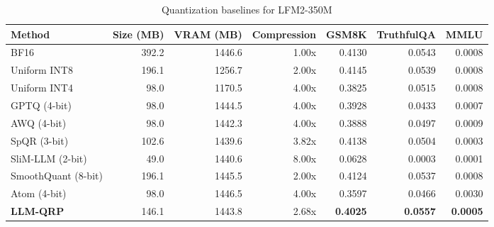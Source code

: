 \begin{table}[htbp]
  \centering
  \small
  \caption{Quantization baselines for LFM2-350M}
  \label{tab:bench_LFM2_350M}
  \begin{tabular}{lrrrrrr}
    \toprule
    \textbf{Method} & \textbf{Size (MB)} & \textbf{VRAM (MB)} & \textbf{Compression} & \textbf{GSM8K} & \textbf{TruthfulQA} & \textbf{MMLU} \\
    \midrule
    BF16 & 392.2 & 1446.6 & 1.00x & 0.4130 & 0.0543 & 0.0008 \\
    Uniform INT8 & 196.1 & 1256.7 & 2.00x & 0.4145 & 0.0539 & 0.0008 \\
    Uniform INT4 & 98.0 & 1170.5 & 4.00x & 0.3825 & 0.0515 & 0.0008 \\
    GPTQ (4-bit) & 98.0 & 1444.5 & 4.00x & 0.3928 & 0.0433 & 0.0007 \\
    AWQ (4-bit) & 98.0 & 1442.3 & 4.00x & 0.3888 & 0.0497 & 0.0009 \\
    SpQR (3-bit) & 102.6 & 1439.6 & 3.82x & 0.4138 & 0.0504 & 0.0003 \\
    SliM-LLM (2-bit) & 49.0 & 1440.6 & 8.00x & 0.0628 & 0.0003 & 0.0001 \\
    SmoothQuant (8-bit) & 196.1 & 1445.5 & 2.00x & 0.4124 & 0.0537 & 0.0008 \\
    Atom (4-bit) & 98.0 & 1446.5 & 4.00x & 0.3597 & 0.0466 & 0.0030 \\
    \midrule
    \textbf{LLM-QRP} & 146.1 & 1443.8 & 2.68x & \textbf{0.4025} & \textbf{0.0557} & \textbf{0.0005} \\
    \bottomrule
  \end{tabular}
\end{table}

